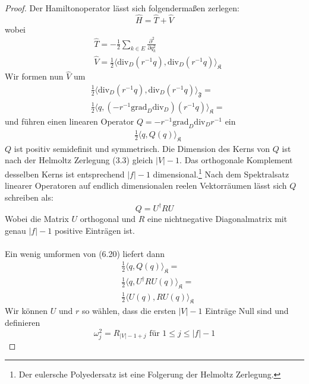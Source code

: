 \documentclass[11pt,a4paper,leqno]{report}
\numberwithin{equation}{chapter}
\begin{document}
\begin{proof}
	Der Hamiltonoperator l\"asst sich folgenderma\ss{}en zerlegen:
	\begin{equation*}
		\hat{H} = \hat{T} + \hat{V}
	\end{equation*}
	wobei
	\begin{align*}
		&\hat{T} = -\frac{1}{2}\sum_{k\in E}\frac{\partial^2}{\partial q_k^2}\\
	    &\hat{V} = \frac{1}{2}\langle \text{div}_D(r^{-1}q), \text{div}_D(r^{-1}q)\rangle_{\mathfrak{K}}
	\end{align*}
	Wir formen nun $\hat{V}$ um
	\begin{align*}
		&\frac{1}{2}\langle \text{div}_D(r^{-1}q), \text{div}_D(r^{-1}q)\rangle_{\mathfrak{F}}=\\
		&\frac{1}{2}\langle q, (-r^{-1}\text{grad}_D\text{div}_D)(r^{-1}q)\rangle_{\mathfrak{K}}=
	\end{align*}
	und f\"uhren einen linearen Operator $Q=-r^{-1}\text{grad}_D\text{div}_Dr^{-1}$ ein
	\begin{align}
		&\frac{1}{2}\langle q, Q(q)\rangle_{\mathfrak{K}}
	\end{align}
	$Q$ ist positiv semidefinit und symmetrisch. Die Dimension des Kerns von $Q$ ist nach der Helmoltz Zerlegung (3.3) gleich $|V| - 1$. Das orthogonale Komplement desselben Kerns ist entsprechend $|f| - 1$ dimensional.\footnote{Der eulersche Polyedersatz ist eine Folgerung der Helmoltz Zerlegung.}
	Nach dem Spektralsatz linearer Operatoren auf endlich dimensionalen reelen Vektorr\"aumen l\"asst sich $Q$ schreiben als:
	\begin{equation*}
		Q = U^\dagger R U
	\end{equation*}
	Wobei die Matrix $U$ orthogonal und $R$ eine nichtnegative Diagonalmatrix mit genau $|f| - 1$ positive Eintr\"agen ist. \\
	\\
	Ein wenig umformen von (6.20) liefert dann
	\begin{align*}
		&\frac{1}{2}\langle q, Q(q)\rangle_{\mathfrak{K}}=\\
		&\frac{1}{2}\langle q, U^\dagger R U(q)\rangle_{\mathfrak{K}}=\\
		&\frac{1}{2}\langle U(q), R U(q)\rangle_{\mathfrak{K}}
	\end{align*}
	Wir k\"onnen $U$ und $r$ so w\"ahlen, dass die ersten $|V|-1$ Eintr\"age Null sind und definieren 
	\begin{equation*}
		\omega_j^2 = R_{|V|-1 + j} \text{ f\"ur }1\leq j \leq |f| - 1

\end{equation*}
\end{proof}
\end{document}
